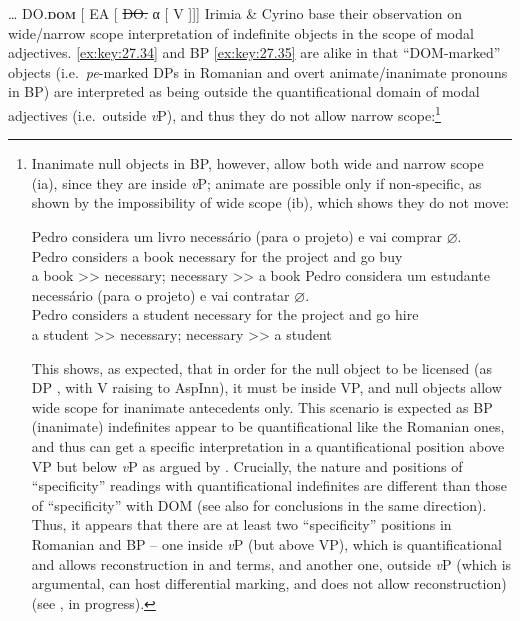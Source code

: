 \documentclass[output=paper]{langsci/langscibook}
\begin{document}
\ea\label{ex:key:27.33}
    \tss{} \dots{} \gls{DO}.\textbf{\textsc{dom}} [ \gls{EA}
    [ \sout{\gls{DO}.\textbf{\Dom}} α [ V \sout{} ]]]
\z
Irimia \& Cyrino base their observation on wide/narrow scope interpretation of
indefinite objects in the scope of modal adjectives.  \eqref{ex:key:27.34} and \gls{BP} \eqref{ex:key:27.35}
are alike in that ``DOM-marked'' objects (i.e.\ \emph{pe}{}-marked DPs in
Romanian and overt animate/inanimate pronouns in BP)  are interpreted as being
outside the quantificational domain of modal adjectives (i.e.\ outside
\emph{v}P), and thus they do not allow narrow scope:\footnote{Inanimate null
objects in \gls{BP}, however, allow both wide and narrow scope (ia), since they are
inside \emph{v}P; animate  are possible only if non-specific, as shown by
the impossibility of wide scope (ib), which shows they do not move:

\begin{xlist}
        \ea
            \gll    Pedro considera um livro necessário (para o   projeto) e vai comprar \textbf{$\varnothing$}.\\
                    Pedro  considers a    book necessary for   the project  and go buy\\
            \glt    a book >> necessary; necessary >> a book
        \ex
            \gll    Pedro considera um estudante necessário (para o   projeto) e   vai contratar \textbf{$\varnothing$}.\\
                    Pedro considers  a    student necessary    for   the project  and go hire\\
            \glt    *a student >> necessary; necessary >> a student
        \z
\end{xlist}
This shows, as expected, that in order for the null object to be licensed (as
DP , with V raising to AspInn), it must be inside VP, and null
objects allow wide scope for inanimate antecedents only.  This scenario is
expected as \gls{BP} (inanimate) indefinites appear to be quantificational like the
Romanian ones, and thus can get a specific interpretation in a quantificational
position above VP but below \emph{v}P as argued by
\citet{IrimiaCyrino2015,IrimiaCyrino2017}. Crucially, the nature and positions
of \enquote{specificity} readings with quantificational indefinites are
different than those of \enquote{specificity} with DOM (see also \citealt{Lopez2012} for conclusions in the same direction).
Thus, it appears that there are at least two \enquote{specificity} positions in
Romanian and \gls{BP} -- one inside \emph{v}P (but
above VP), which is quantificational and allows reconstruction in
 and  terms, and another one, outside
\emph{v}P (which is argumental, can host differential marking, and does not
allow reconstruction) (see \citealt{IrimiaCyrino2015}, in progress).}
\end{document}
